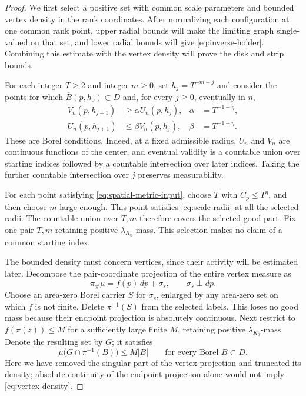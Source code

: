 \begin{proof}
We first select a positive set with common scale parameters and bounded
vertex density in the rank coordinates. After normalizing each
configuration at one common rank point, upper radial bounds will make the limiting graph single-valued
on that set, and lower radial bounds will give \eqref{eq:inverse-holder}.
Combining this estimate with the vertex density will prove the disk
and strip bounds.

For each integer $T\ge2$ and integer $m\ge0$, set
$h_j=T^{-m-j}$ and consider the points for which
$\overline B(p,h_0)\subset D$ and, for every $j\ge0$, eventually in $n$,
\begin{equation}
 \begin{aligned}
 V_n(p,h_{j+1})&\ge \alpha U_n(p,h_j),
 &\alpha&=T^{-1-\eta},\\
 U_n(p,h_{j+1})&\le \beta V_n(p,h_j),
 &\beta&=T^{-1+\eta}.
 \end{aligned}
 \label{eq:scale-radii}
\end{equation}
These are Borel conditions.  Indeed, at a fixed admissible radius,
$U_n$ and $V_n$ are continuous functions of the center, and eventual
validity is a countable union over starting indices followed by a
countable intersection over later indices.  Taking the further countable
intersection over $j$ preserves measurability.

For each point satisfying \eqref{eq:spatial-metric-input}, choose $T$
with $C_p\le T^\eta$, and then choose $m$ large enough.  This point
satisfies \eqref{eq:scale-radii} at all the selected radii.  The countable
union over $T,m$ therefore covers the selected good part.  Fix one pair
$T,m$ retaining positive $\lambda_{K_0}$-mass.  This selection makes no
claim of a common starting index.

The bounded density must concern vertices, since their activity will be
estimated later.  Decompose the pair-coordinate projection of the entire
vertex measure as
\[
 \pi_\#\mu=f(p)\,dp+\sigma_s,
 \qquad \sigma_s\perp dp.
\]
Choose an area-zero Borel carrier $S$ for $\sigma_s$, enlarged by any
area-zero set on which $f$ is not finite.  Delete $\pi^{-1}(S)$ from the
selected labels.  This loses no good mass because their endpoint
projection is absolutely continuous.  Next restrict to
$f(\pi(z))\le M$ for a sufficiently large finite $M$, retaining positive
$\lambda_{K_0}$-mass. Denote the resulting set by $G$; it satisfies
\begin{equation}
 \mu\bigl(G\cap\pi^{-1}(B)\bigr)\le M|B|
 \qquad\text{for every Borel }B\subset D.
 \label{eq:vertex-density}
\end{equation}
Here we have removed the singular part of the vertex projection and
truncated its density; absolute continuity of the endpoint projection
alone would not imply \eqref{eq:vertex-density}.


\end{proof}

